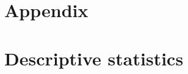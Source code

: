 \begin{framefont}{\small}
\appendix
\section{Appendix}



	

\section{Descriptive statistics}


\end{framefont}
